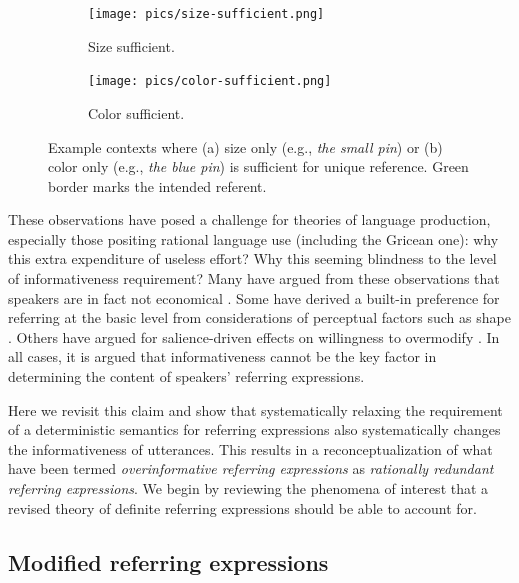 \documentclass[11pt]{article}
\begin{document}
\begin{figure}
\begin{subfigure}{.5\textwidth}
\texttt{[image: pics/size-sufficient.png]}
\caption{Size sufficient.}
\label{fig:sizesufficient}
\end{subfigure}
\begin{subfigure}{.5\textwidth}
\texttt{[image: pics/color-sufficient.png]}
\caption{Color sufficient.}
\label{fig:colorsufficient}
\end{subfigure}
\caption{Example contexts where (a) size only (e.g., \emph{the small pin}) or (b) color only (e.g., \emph{the blue pin}) is sufficient for unique reference. Green border marks the intended referent.}
\label{fig:pin}
\end{figure}

These observations have posed a challenge for theories of language production, especially those positing rational language use (including the Gricean one): why this extra expenditure of useless effort? Why this seeming blindness to the level of informativeness requirement? Many have argued from these observations that speakers are in fact not economical \cite{Engelhardt2006, Pechmann1989}. Some have derived a built-in preference for referring at the basic level from considerations of perceptual factors such as shape \cite{Rosch1976, Rosch1973, murphy1982basic}. Others have argued for salience-driven effects on willingness to overmodify \cite{Gatt2014, Westerbeek2015}. In all cases, it is argued that informativeness cannot be the key factor in determining the content of speakers' referring expressions. 

Here we revisit this claim and show that systematically relaxing the requirement of a deterministic semantics for referring expressions also systematically changes the informativeness of utterances. This results in a reconceptualization of what have been termed \emph{overinformative referring expressions} as \emph{rationally redundant referring expressions}. We begin by reviewing the phenomena of interest that a revised theory of definite referring expressions should be able to account for. 

\subsection{Modified referring expressions}
\label{sec:modified}
\end{document}

